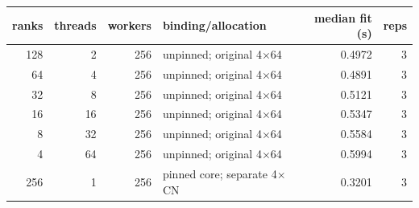 \begin{tabular}{rrrlrr}
\toprule
ranks & threads & workers & binding/allocation & median fit (s) & reps\\
\midrule
128 & 2 & 256 & unpinned; original 4$\times$64 & 0.4972 & 3\\
64 & 4 & 256 & unpinned; original 4$\times$64 & 0.4891 & 3\\
32 & 8 & 256 & unpinned; original 4$\times$64 & 0.5121 & 3\\
16 & 16 & 256 & unpinned; original 4$\times$64 & 0.5347 & 3\\
8 & 32 & 256 & unpinned; original 4$\times$64 & 0.5584 & 3\\
4 & 64 & 256 & unpinned; original 4$\times$64 & 0.5994 & 3\\
256 & 1 & 256 & pinned core; separate 4$\times$CN & 0.3201 & 3\\
\bottomrule
\end{tabular}
